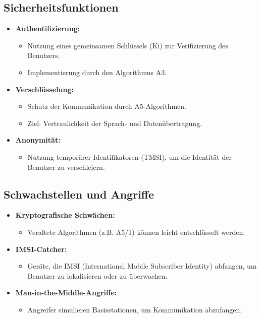 \documentclass{article}
\begin{document}
\subsection{Sicherheitsfunktionen}
\begin{itemize}
    \item \textbf{Authentifizierung:}
    \begin{itemize}
        \item Nutzung eines gemeinsamen Schlüssels (Ki) zur Verifizierung des Benutzers.
        \item Implementierung durch den Algorithmus A3.
    \end{itemize}
    \item \textbf{Verschlüsselung:}
    \begin{itemize}
        \item Schutz der Kommunikation durch A5-Algorithmen.
        \item Ziel: Vertraulichkeit der Sprach- und Datenübertragung.
    \end{itemize}
    \item \textbf{Anonymität:}
    \begin{itemize}
        \item Nutzung temporärer Identifikatoren (TMSI), um die Identität der Benutzer zu verschleiern.
    \end{itemize}
\end{itemize}

\subsection{Schwachstellen und Angriffe}
\begin{itemize}
    \item \textbf{Kryptografische Schwächen:}
    \begin{itemize}
        \item Veraltete Algorithmen (z.B. A5/1) können leicht entschlüsselt werden.
    \end{itemize}
    \item \textbf{IMSI-Catcher:}
    \begin{itemize}
        \item Geräte, die IMSI (International Mobile Subscriber Identity) abfangen, um Benutzer zu lokalisieren oder zu überwachen.
    \end{itemize}
    \item \textbf{Man-in-the-Middle-Angriffe:}
    \begin{itemize}
        \item Angreifer simulieren Basisstationen, um Kommunikation abzufangen.
    \end{itemize}
\end{itemize}
\end{document}
